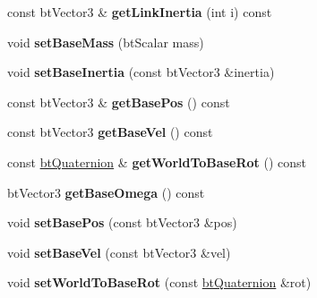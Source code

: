 \begin{DoxyCompactItemize}
\item 
\hypertarget{classbt_multi_body_a19762042ddc38fb5a2b0be384d87ac27}{const bt\+Vector3 \& {\bfseries get\+Link\+Inertia} (int i) const }\label{classbt_multi_body_a19762042ddc38fb5a2b0be384d87ac27}

\item 
\hypertarget{classbt_multi_body_a39b17484fc121b0ec1f859e0f50e7552}{void {\bfseries set\+Base\+Mass} (bt\+Scalar mass)}\label{classbt_multi_body_a39b17484fc121b0ec1f859e0f50e7552}

\item 
\hypertarget{classbt_multi_body_a4043d6629d0585f67c8a82d0274ff17c}{void {\bfseries set\+Base\+Inertia} (const bt\+Vector3 \&inertia)}\label{classbt_multi_body_a4043d6629d0585f67c8a82d0274ff17c}

\item 
\hypertarget{classbt_multi_body_a5fc3f6bd2957523e68c4ee84342b8dae}{const bt\+Vector3 \& {\bfseries get\+Base\+Pos} () const }\label{classbt_multi_body_a5fc3f6bd2957523e68c4ee84342b8dae}

\item 
\hypertarget{classbt_multi_body_aab8838b6832975800672431df4f74e63}{const bt\+Vector3 {\bfseries get\+Base\+Vel} () const }\label{classbt_multi_body_aab8838b6832975800672431df4f74e63}

\item 
\hypertarget{classbt_multi_body_a3b2fda3ba8e8203f97d796e1913ad36e}{const \hyperlink{classbt_quaternion}{bt\+Quaternion} \& {\bfseries get\+World\+To\+Base\+Rot} () const }\label{classbt_multi_body_a3b2fda3ba8e8203f97d796e1913ad36e}

\item 
\hypertarget{classbt_multi_body_a8ef1c6776b5e670ca0e0f69156d02dc0}{bt\+Vector3 {\bfseries get\+Base\+Omega} () const }\label{classbt_multi_body_a8ef1c6776b5e670ca0e0f69156d02dc0}

\item 
\hypertarget{classbt_multi_body_a7860a23d986ca40ca24112fc4870e9db}{void {\bfseries set\+Base\+Pos} (const bt\+Vector3 \&pos)}\label{classbt_multi_body_a7860a23d986ca40ca24112fc4870e9db}

\item 
\hypertarget{classbt_multi_body_a559187909a25d3fb42140abf079d84cd}{void {\bfseries set\+Base\+Vel} (const bt\+Vector3 \&vel)}\label{classbt_multi_body_a559187909a25d3fb42140abf079d84cd}

\item 
\hypertarget{classbt_multi_body_aea1adaa2e8f6bf164abe19275427dcea}{void {\bfseries set\+World\+To\+Base\+Rot} (const \hyperlink{classbt_quaternion}{bt\+Quaternion} \&rot)}\label{classbt_multi_body_aea1adaa2e8f6bf164abe19275427dcea}


\end{DoxyCompactItemize}

